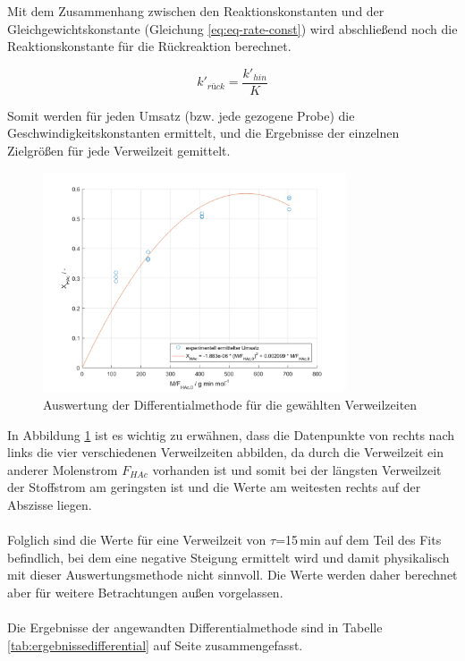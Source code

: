 \documentclass[12pt,liststotoc]{report}
\begin{document}
\newpage
Mit dem Zusammenhang zwischen den Reaktionskonstanten und der Gleichgewichtskonstante (Gleichung \ref{eq:eq-rate-const}) wird abschließend noch die Reaktionskonstante für die Rückreaktion berechnet.

\begin{equation*}
k'_{rück}=\frac{k'_{hin}}{K}
\end{equation*}

Somit werden für jeden Umsatz (bzw. jede gezogene Probe) die Geschwindigkeitskonstanten ermittelt, und die Ergebnisse der einzelnen Zielgrößen für jede Verweilzeit gemittelt.


\begin{figure}[H]
\centering
\includegraphics[width=0.8\textwidth]{Graphics/differential_analysis.png} 
\caption{Auswertung der Differentialmethode für die gewählten Verweilzeiten}
\label{Differentialanalysis}
\end{figure}
\noindent
In Abbildung \ref{Differentialanalysis} ist es wichtig zu erwähnen, dass die Datenpunkte von rechts nach links die vier verschiedenen Verweilzeiten abbilden, da durch die Verweilzeit ein anderer Molenstrom $F_{HAc}$ vorhanden ist und somit bei der längsten Verweilzeit der Stoffstrom am geringsten ist und die Werte am weitesten rechts auf der Abszisse liegen. 
\\
\\
Folglich sind die Werte für eine Verweilzeit von $\tau$=15\,min auf dem Teil des Fits befindlich, bei dem eine negative Steigung ermittelt wird und damit physikalisch mit dieser Auswertungsmethode nicht sinnvoll. Die Werte werden daher berechnet aber für weitere Betrachtungen außen vorgelassen. 
\\
\\
Die Ergebnisse der angewandten Differentialmethode sind in Tabelle \ref{tab:ergebnissedifferential} auf Seite \pageref{tab:ergebnissedifferential} zusammengefasst.
\end{document}

